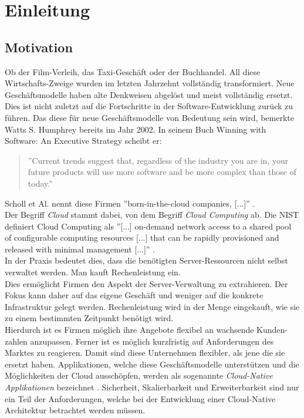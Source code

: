 \chapter{Einleitung}

\section{Motivation}
Ob der Film-Verleih, das Taxi-Geschäft oder der Buchhandel. All diese Wirtschafts-Zweige wurden im letzten Jahrzehnt vollständig transformiert.  Neue Geschäftsmodelle haben alte Denkweisen abgelöst und meist vollständig ersetzt. Dies ist nicht zuletzt auf die Fortschritte in der Software-Entwicklung zurück zu führen. Das diese für neue Geschäftsmodelle von Bedeutung sein wird, bemerkte Watts S. Humphrey bereits im Jahr 2002. In seinem Buch Winning with Software: An Executive Strategy scheibt er: 
\begin{quote}
''Current trends suggest that, regardless of the industry you are in, your future products will use more software and be more complex than those of today.''\cite{humphrey_why_2002}
\end{quote}
Scholl et Al. nennt diese Firmen ''born-in-the-cloud companies, [...]'' \cite{scholl_cloud_2019}.\\
Der Begriff \textit{Cloud} stammt dabei, von dem Begriff \textit{Cloud Computing} ab. Die NIST definiert Cloud Computing als ''[...] on-demand network access to a shared pool of configurable computing resources [...] that can be rapidly provisioned and released with minimal management [...]'' \cite{mell_nist_2011}.\\
In der Praxis bedeutet dies, dass die benötigten Server-Ressourcen nicht selbst verwaltet werden. Man kauft Rechenleistung ein.\\
Dies ermöglicht Firmen den Aspekt der Server-Verwaltung zu extrahieren. Der Fokus kann daher auf das eigene Geschäft und weniger auf die konkrete Infrastruktur gelegt werden. Rechenleistung wird in der Menge eingekauft, wie sie zu einem bestimmten Zeitpunkt benötigt wird.\\
Hierdurch ist es Firmen möglich ihre Angebote flexibel an wachsende Kunden-zahlen anzupassen. Ferner ist es möglich kurzfristig auf Anforderungen des Marktes zu reagieren. Damit sind diese Unternehmen flexibler, als jene die sie ersetzt haben. Applikationen, welche diese Geschäftsmodelle unterstützen und die Möglichkeiten der Cloud ausschöpfen, werden als sogenannte \textit{Cloud-Native Applikationen} bezeichnet \cite{scholl_cloud_2019}.  Sicherheit, Skalierbarkeit und Erweiterbarkeit sind nur ein Teil der Anforderungen, welche bei der Entwicklung einer Cloud-Native Architektur betrachtet werden müssen. 

